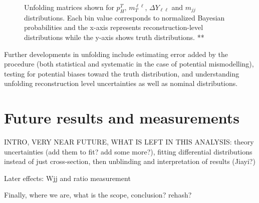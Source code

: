 \begin{figure}[!h]
{  }%
\caption{\label{fig:unfoldingmatrices}Unfolding matrices shown for $p^T_H$, $m_T^{\ell\ell}$, $\Delta Y_{\ell\ell}$ and $m_{jj}$ distributions. Each bin value corresponds to normalized Bayesian probabilities and the x-axis represents reconstruction-level distributions while the y-axis shows truth distributions. **}
\end{figure}  

Further developments in unfolding include estimating error added by the procedure (both statistical and systematic in the case of potential mismodelling), testing for potential biases toward the truth distribution, and understanding unfolding reconstruction level uncertainties as well as nominal distributions. 

\section{Future results and measurements}

INTRO, VERY NEAR FUTURE, WHAT IS LEFT IN THIS ANALYSIS: theory uncertainties (add them to fit? add some more?), fitting differential distributions instead of just cross-section, then unblinding and interpretation of results (Jiayi?)

Later effects: Wjj and ratio measurement

Finally, where we are, what is the scope, conclusion? rehash?
